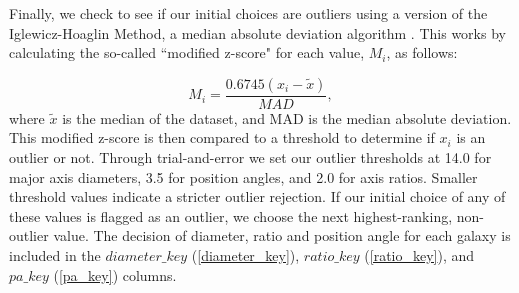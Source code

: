 \documentclass[twocolumn,tighten]{aastex62}
\begin{document}
Finally, we check to see if our initial choices are outliers using a version of the Iglewicz-Hoaglin Method, a median absolute deviation algorithm \citep{iglewicz1993}. This works by calculating the so-called ``modified z-score" for each value, $M_i$, as follows:

\begin{equation}
M_{i} = \frac{0.6745 (x_i - \tilde{x})}{MAD},
\end{equation}
\noindent where $\tilde{x}$ is the median of the dataset, and MAD is the median absolute deviation. This modified z-score is then compared to a threshold to determine if $x_i$ is an outlier or not. Through trial-and-error we set our outlier thresholds at 14.0 for major axis diameters, 3.5 for position angles, and 2.0 for axis ratios. Smaller threshold values indicate a stricter outlier rejection. If our initial choice of any of these values is flagged as an outlier, we choose the next highest-ranking, non-outlier value. The decision of diameter, ratio and position angle for each galaxy is included in the $diameter\_key$ (\ref{diameter_key}), $ratio\_key$ (\ref{ratio_key}), and $pa\_key$ (\ref{pa_key}) columns.


\end{document}
